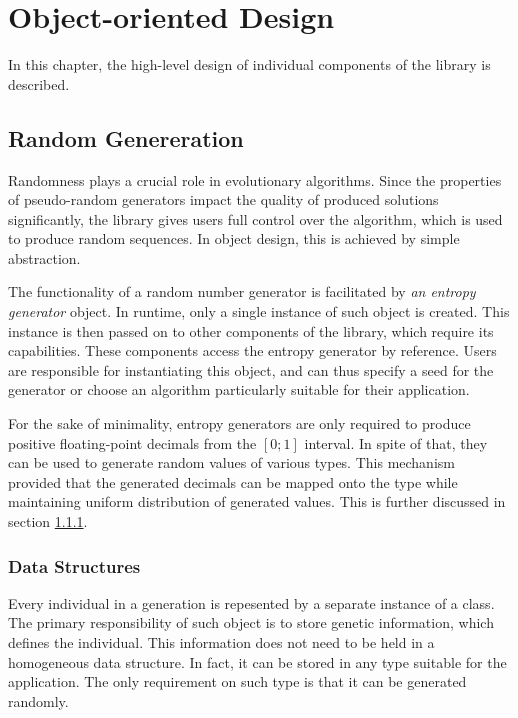 \chapter{Object-oriented Design}
In this chapter, the high-level design of individual components of the library is described.

\cite{Andel07}
\todo %


\section{Random Genereration}
Randomness plays a crucial role in evolutionary algorithms. Since the properties of pseudo-random generators impact the quality of produced solutions significantly, the library gives users full control over the algorithm, which is used to produce random sequences. In object design, this is achieved by simple abstraction.

The functionality of a random number generator is facilitated by \textit{an entropy generator} object. In runtime, only a single instance of such object is created. This instance is then passed on to other components of the library, which require its capabilities. These components access the entropy generator by reference. Users are responsible for instantiating this object, and can thus specify a seed for the generator or choose an algorithm particularly suitable for their application.

For the sake of minimality, entropy generators are only required to produce positive floating-point decimals from the $[0;1]$ interval. In spite of that, they can be used to generate random values of various types. This mechanism provided that the generated decimals can be mapped onto the type while maintaining uniform distribution of generated values. This is further discussed in section \ref{section:data-structures}.


\subsection{Data Structures}\label{section:data-structures}
Every individual in a generation is repesented by a separate instance of a class. The primary responsibility of such object is to store genetic information, which defines the individual. This information does not need to be held in a homogeneous data structure. In fact, it can be stored in any type suitable for the application. The only requirement on such type is that it can be generated randomly.




